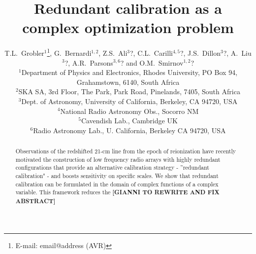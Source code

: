 \documentclass[useAMS,usenatbib]{mn2e}
\title[Unknown]{Redundant calibration as a complex optimization problem}
\author[T.L.~Grobler et al.]{T.L.~Grobler$^{1}$\thanks{E-mail: email@address (AVR)}, G.~Bernardi$^{1,2}$, Z.S.~Ali$^{3}$?, C.L.~Carilli$^{4,5}$?, J.S.~Dillon$^{3}$?, A.~Liu$^{3}$?, \newauthor
A.R.~Parsons$^{3,6}$? and O.M.~Smirnov$^{1,2}$?\\
$^{1}$Department of Physics and Electronics, Rhodes University, PO Box 94, Grahamstown, 6140, South Africa\\
$^{2}$SKA SA, 3rd Floor, The Park, Park Road, Pinelands, 7405, South Africa\\
$^{3}$Dept. of Astronomy, University of California, Berkeley, CA 94720, USA\\
$^{4}$National Radio Astronomy Obs., Socorro NM\\
$^{5}$Cavendish Lab., Cambridge UK\\
$^{6}$Radio Astronomy Lab., U. California, Berkeley CA 94720, USA}
\begin{document}

\pagerange{\pageref{firstpage}--\pageref{lastpage}} 

\maketitle

\label{firstpage}

\begin{abstract}
Observations of the redshifted 21-cm line from the epoch of reionization have recently motivated the construction of low frequency radio arrays with highly redundant configurations that provide an alternative calibration strategy - ''redundant calibration" - and boosts sensitivity on specific scales. We show that redundant calibration can be formulated in the domain of complex functions of a complex variable. This framework reduces the 
\textbf{[GIANNI TO REWRITE AND FIX ABSTRACT]}

\end{abstract}
\end{document}
